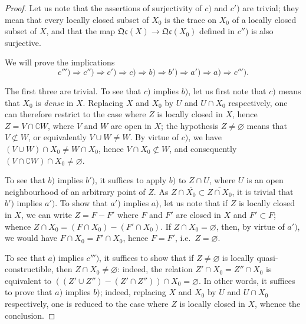 \begin{proof}
Let us note that the assertions of surjectivity of $c)$ and $c')$ are trivial; they mean that every locally closed subset of $X_0$ is the trace on $X_0$ of a locally closed subset of $X$, and that the map $\mathfrak{Qc}(X)\to\mathfrak{Qc}(X_0)$ defined in $c'')$ is also surjective.

We will prove the implications
\[
  c''')\Rightarrow c'')\Rightarrow c')\Rightarrow c)\Rightarrow b)\Rightarrow b')\Rightarrow a')\Rightarrow a)\Rightarrow c''').
\]

The first three are trivial.
To see that $c)$ implies $b)$, let us first note that $c)$ means that $X_0$ is \emph{dense} in $X$.
Replacing $X$ and $X_0$ by $U$ and $U\cap X_0$ respectively, one can therefore restrict to the case where $Z$ is locally closed in $X$, hence $Z=V\cap\complement W$, where $V$ and $W$ are open in $X$; the hypothesis $Z\neq\varnothing$ means that $V\not\subset W$, or equivalently $V\cup W\neq W$.
By virtue of $c)$, we have $(V\cup W)\cap X_0\neq W\cap X_0$, hence $V\cap X_0\not\subset W$, and consequently $(V\cap\complement W)\cap X_0\neq\varnothing$.

To see that $b)$ implies $b')$, it suffices to apply $b)$ to $Z\cap U$, where $U$ is an open neighbourhood of an arbitrary point of $Z$.
As $Z\cap\overline{X_0}\subset\overline{Z\cap X_0}$, it is trivial that $b')$ implies $a')$.
To show that $a')$ implies $a)$, let us note that if $Z$ is locally closed in $X$, we can write $Z=F-F'$ where $F$ and $F'$ are closed in $X$ and $F'\subset F$; whence $Z\cap X_0=(F\cap X_0)-(F'\cap X_0)$.
If $Z\cap X_0=\varnothing$, then, by virtue of $a')$, we would have $F\cap X_0=F'\cap X_0$, hence $F=F'$, i.e.\ $Z=\varnothing$.

To see that $a)$ implies $c''')$, it suffices to show that if $Z\neq\varnothing$ is locally quasi-constructible, then $Z\cap X_0\neq\varnothing$: indeed, the relation $Z'\cap X_0=Z''\cap X_0$ is equivalent to $((Z'\cup Z'')-(Z'\cap Z''))\cap X_0=\varnothing$.
In other words, it suffices to prove that $a)$ implies $b)$; indeed, replacing $X$ and $X_0$ by $U$ and $U\cap X_0$ respectively, one is reduced to the case where $Z$ is locally closed in $X$, whence the conclusion.


\end{proof}
